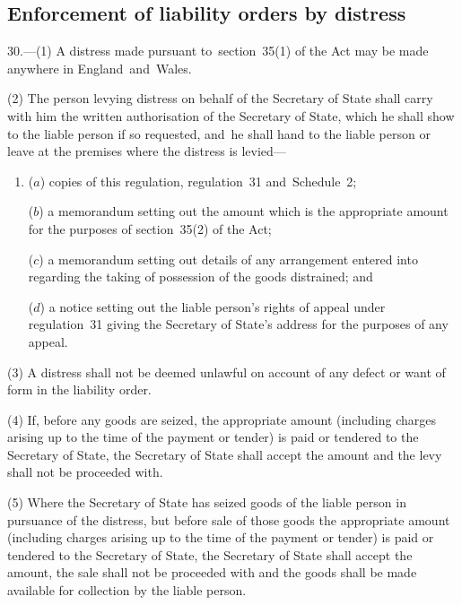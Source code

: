 \documentclass[12pt,a4paper]{article}
\begin{document}

\subsection[30. Enforcement of liability orders by distress]{Enforcement of liability orders by distress}

30.—(1) A distress made pursuant to~section~35(1) of the Act may be made anywhere in England~and~Wales.

(2) The person levying distress on behalf of the Secretary of State shall carry with him the written authorisation of the Secretary of State, which he shall show to the liable person if so requested, and~he shall hand to the liable person or leave at the premises where the distress is levied—
\begin{enumerate}\item[]
($a$) copies of this regulation, regulation~31 and~Schedule~2;

($b$) a memorandum setting out the amount which is the appropriate amount for the purposes of section~35(2) of the Act;

($c$) a memorandum setting out details of any arrangement entered into regarding the taking of possession of the goods distrained; and

($d$) a notice setting out the liable person’s rights of appeal under regulation~31 giving the Secretary of State’s address for the purposes of any appeal.
\end{enumerate}

(3) A distress shall not be deemed unlawful on account of any defect or want of form in the liability order.

(4) If, before any goods are seized, the appropriate amount (including charges arising up to the time of the payment or tender) is paid or tendered to the Secretary of State, the Secretary of State shall accept the amount and the levy shall not be proceeded with.

(5) Where the Secretary of State has seized goods of the liable person in pursuance of the distress, but before sale of those goods the appropriate amount (including charges arising up to the time of the payment or tender) is paid or tendered to the Secretary of State, the Secretary of State shall accept the amount, the sale shall not be proceeded with and the goods shall be made available for collection by the liable person.
\end{document}
